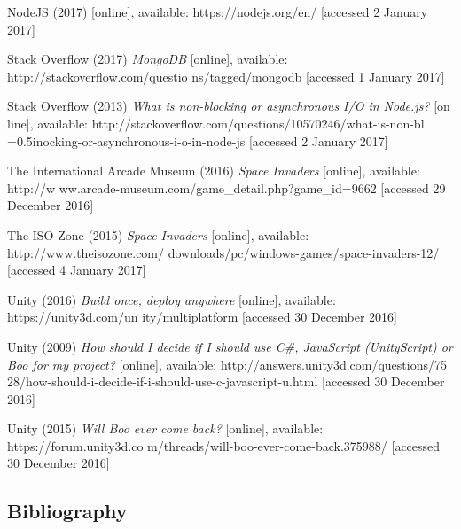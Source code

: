 \documentclass[12pt]{article}
\begin{document}
NodeJS (2017)  [online], available: https://nodejs.org/en/ [accessed 2 January 
\hangindent=0.5in 2017]

Stack Overflow (2017) \textit{MongoDB} [online], available:
http://stackoverflow.com/questio
\hangindent=0.5in ns/tagged/mongodb [accessed 1 January 2017]

Stack Overflow (2013) \textit{What is non-blocking or asynchronous I/O in Node.js?} [on
\hangindent=0.5in line], available: http://stackoverflow.com/questions/10570246/what-is-non-bl 
\hangindent=0.5inocking-or-asynchronous-i-o-in-node-js [accessed 2 January 2017]

The International Arcade Museum (2016) \textit{Space Invaders} [online], available: http://w
\hangindent=0.5in ww.arcade-museum.com/game{\_}detail.php?game{\_}id=9662 [accessed 29 December 2016]

The ISO Zone (2015) \textit{Space Invaders} [online], available:
http://www.theisozone.com/
\hangindent=0.5in downloads/pc/windows-games/space-invaders-12/
[accessed 4 January 2017]

Unity (2016) \textit{Build once, deploy anywhere} [online], available: https://unity3d.com/un
\hangindent=0.5in ity/multiplatform [accessed 30 December 2016]

Unity (2009) \textit{How should I decide if I should use C#, JavaScript (UnityScript) or 
\hangindent=0.5in Boo for my project?} [online], available: http://answers.unity3d.com/questions/75
\hangindent=0.5in 28/how-should-i-decide-if-i-should-use-c-javascript-u.html [accessed 30 December 2016]

Unity (2015) \textit{Will Boo ever come back?} [online], available:
https://forum.unity3d.co
\hangindent=0.5in m/threads/will-boo-ever-come-back.375988/ [accessed 30
December 2016]

\newpage
\begin{center}
\section{Bibliography}
\end{center}

\end{document}
